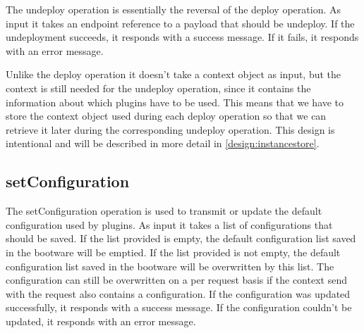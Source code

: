 The undeploy operation is essentially the reversal of the deploy operation.
As input it takes an endpoint reference to a payload that should be undeploy.
If the undeployment succeeds, it responds with a success message.
If it fails, it responds with an error message.

Unlike the deploy operation it doesn't take a context object as input, but the context is still needed for the undeploy operation, since it contains the information about which plugins have to be used.
This means that we have to store the context object used during each deploy operation so that we can retrieve it later during the corresponding undeploy operation.
This design is intentional and will be described in more detail in \autoref{design:instancestore}.

\subsection{setConfiguration}

The setConfiguration operation is used to transmit or update the default configuration used by plugins.
As input it takes a list of configurations that should be saved.
If the list provided is empty, the default configuration list saved in the bootware will be emptied.
If the list provided is not empty, the default configuration list saved in the bootware will be overwritten by this list.
The configuration can still be overwritten on a per request basis if the context send with the request also contains a configuration.
If the configuration was updated successfully, it responds with a success message.
If the configuration couldn't be updated, it responds with an error message.
